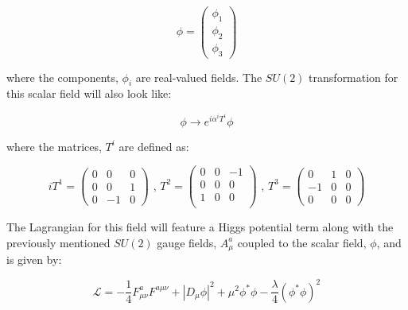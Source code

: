 \begin{equation}\label{eq:non_abelian_higgs_mechanism_phi}
\phi = 
  \begin{pmatrix}
    \phi_{1} \\
    \phi_{2} \\
    \phi_{3}
    \end{pmatrix}
\end{equation}

\noindent where the components, $\phi_{i}$ are real-valued fields.
The $SU(2)$ transformation for this scalar field will also look like:

\begin{equation}\label{eq:non_abelian_higgs_mechanism_transformation}
\phi \rightarrow e^{i\alpha^{i}T^{i}}\phi
\end{equation}

\noindent where the matrices, $T^{i}$ are defined as:

\tiny
\begin{equation}\label{eq:non_abelian_higgs_mechanism_generators}
iT^{1} = 
  \begin{pmatrix}
    0  &  0  &  0 \\
    0  &  0  &  1 \\
    0  & -1 &  0 
  \end{pmatrix}
\text{   ,    }
T^{2} = 
  \begin{pmatrix}
    0  &  0  & -1 \\
    0  &  0  &  0 \\
    1  &  0  &  0 \\ 
  \end{pmatrix}
\text{   ,   }
T^{3} = 
  \begin{pmatrix}
    0  &   1  &  0 \\
   -1 &   0  &  0 \\
    0  &   0  &  0
  \end{pmatrix}
\end{equation}
\normalsize

\noindent The Lagrangian for this field will feature a Higgs potential
term along with the previously mentioned $SU(2)$ gauge fields, $A_{\mu}^{a}$ coupled
to the scalar field, $\phi$, and is given by:

\begin{equation}\label{eq:non_abelian_higgs_mechanism_lagrangian}
\mathcal{L} = -\frac{1}{4}F_{\mu\nu}^{a}F^{a\mu\nu}+ |D_{\mu}\phi|^{2}
+ \mu^{2}\phi^{\ast}\phi - \frac{\lambda}{4}(\phi^{\ast}\phi)^{2}
\end{equation}

